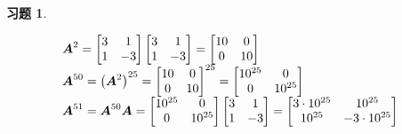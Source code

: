 \documentclass{ctexart}
\newtheorem{problem}{习题}[section]
\begin{document}
\begin{problem}\

\begin{equation*}
    \begin{array}{lll}
        \boldsymbol{A}^2=\begin{bmatrix}3&1\\1&-3\end{bmatrix}\begin{bmatrix}3&1\\1&-3\end{bmatrix}=\begin{bmatrix}10&0\\0&10\end{bmatrix}      \\
        \boldsymbol{A}^{50}=\left( \boldsymbol{A}^2 \right)^{25}={\begin{bmatrix}10&0\\0&10\end{bmatrix}}^{25}=\begin{bmatrix}10^{25}&0\\0&10^{25}\end{bmatrix} \\
        \boldsymbol{A}^{51}=\boldsymbol{A}^{50}\boldsymbol{A}=\begin{bmatrix}10^{25}&0\\0&10^{25}\end{bmatrix}\begin{bmatrix}3&1\\1&-3\end{bmatrix}=\begin{bmatrix}3\cdot10^{25}&10^{25}\\10^{25}&-3\cdot10^{25}\end{bmatrix}
    \end{array}
\end{equation*}
\end{problem}
\end{document}
